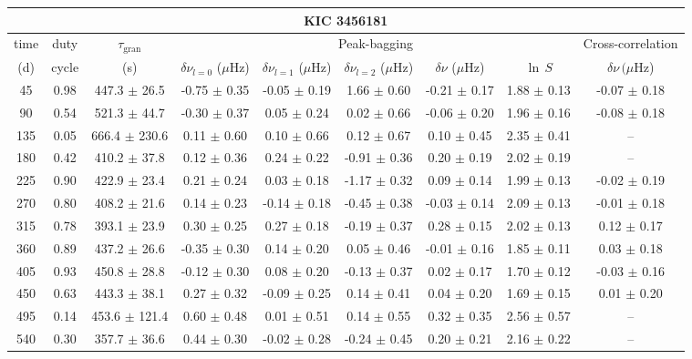 \documentclass[twocolumn]{aastex61}%
\begin{document}
\begin{table*}[ht]\centering\fontsize{9.}{7.}\selectfont
\begin{tabular}{ccc|ccccc|c}
\multicolumn{9}{c}{KIC 3456181}\\ \hline\hline
time & duty & $\tau_\text{gran}$ &\multicolumn{5}{c|}{Peak-bagging}&Cross-correlation\\
(d)& cycle & (s)&$\delta\nu_{l=0}$ ($\mu$Hz) & $\delta\nu_{l=1}$ ($\mu$Hz) & $\delta\nu_{l=2}$ ($\mu$Hz) & $\delta\nu$ ($\mu$Hz)& $\ln\,S$ & $\delta\nu\,(\mu$Hz)\\\hline
45 & 0.98 & 447.3 $\pm$ 26.5 & -0.75 $\pm$ 0.35 & -0.05 $\pm$ 0.19 & 1.66 $\pm$ 0.60 & -0.21 $\pm$ 0.17 & 1.88 $\pm$ 0.13 & -0.07 $\pm$ 0.18\\
90 & 0.54 & 521.3 $\pm$ 44.7 & -0.30 $\pm$ 0.37 & 0.05 $\pm$ 0.24 & 0.02 $\pm$ 0.66 & -0.06 $\pm$ 0.20 & 1.96 $\pm$ 0.16 & -0.08 $\pm$ 0.18\\
135 & 0.05 & 666.4 $\pm$ 230.6 & 0.11 $\pm$ 0.60 & 0.10 $\pm$ 0.66 & 0.12 $\pm$ 0.67 & 0.10 $\pm$ 0.45 & 2.35 $\pm$ 0.41 & --\\
180 & 0.42 & 410.2 $\pm$ 37.8 & 0.12 $\pm$ 0.36 & 0.24 $\pm$ 0.22 & -0.91 $\pm$ 0.36 & 0.20 $\pm$ 0.19 & 2.02 $\pm$ 0.19 & --\\
225 & 0.90 & 422.9 $\pm$ 23.4 & 0.21 $\pm$ 0.24 & 0.03 $\pm$ 0.18 & -1.17 $\pm$ 0.32 & 0.09 $\pm$ 0.14 & 1.99 $\pm$ 0.13 & -0.02 $\pm$ 0.19\\
270 & 0.80 & 408.2 $\pm$ 21.6 & 0.14 $\pm$ 0.23 & -0.14 $\pm$ 0.18 & -0.45 $\pm$ 0.38 & -0.03 $\pm$ 0.14 & 2.09 $\pm$ 0.13 & -0.01 $\pm$ 0.18\\
315 & 0.78 & 393.1 $\pm$ 23.9 & 0.30 $\pm$ 0.25 & 0.27 $\pm$ 0.18 & -0.19 $\pm$ 0.37 & 0.28 $\pm$ 0.15 & 2.02 $\pm$ 0.13 & 0.12 $\pm$ 0.17\\
360 & 0.89 & 437.2 $\pm$ 26.6 & -0.35 $\pm$ 0.30 & 0.14 $\pm$ 0.20 & 0.05 $\pm$ 0.46 & -0.01 $\pm$ 0.16 & 1.85 $\pm$ 0.11 & 0.03 $\pm$ 0.18\\
405 & 0.93 & 450.8 $\pm$ 28.8 & -0.12 $\pm$ 0.30 & 0.08 $\pm$ 0.20 & -0.13 $\pm$ 0.37 & 0.02 $\pm$ 0.17 & 1.70 $\pm$ 0.12 & -0.03 $\pm$ 0.16\\
450 & 0.63 & 443.3 $\pm$ 38.1 & 0.27 $\pm$ 0.32 & -0.09 $\pm$ 0.25 & 0.14 $\pm$ 0.41 & 0.04 $\pm$ 0.20 & 1.69 $\pm$ 0.15 & 0.01 $\pm$ 0.20\\
495 & 0.14 & 453.6 $\pm$ 121.4 & 0.60 $\pm$ 0.48 & 0.01 $\pm$ 0.51 & 0.14 $\pm$ 0.55 & 0.32 $\pm$ 0.35 & 2.56 $\pm$ 0.57 & --\\
540 & 0.30 & 357.7 $\pm$ 36.6 & 0.44 $\pm$ 0.30 & -0.02 $\pm$ 0.28 & -0.24 $\pm$ 0.45 & 0.20 $\pm$ 0.21 & 2.16 $\pm$ 0.22 & --\\

\end{tabular}
\end{table*}
\end{document}

